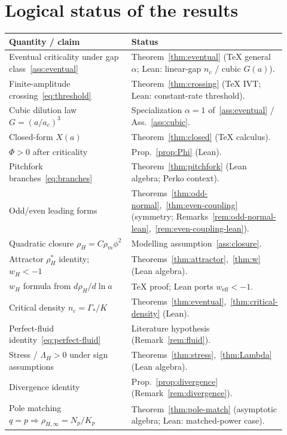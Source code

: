 \documentclass[11pt]{article}
\theoremstyle{definition}
\theoremstyle{remark}
\begin{document}
\section{Logical status of the results}
\label{sec:status}
\begin{center}
\small
\begin{tabular}{@{}p{0.46\linewidth}p{0.46\linewidth}@{}}
\toprule
\textbf{Quantity / claim} & \textbf{Status}\\
\midrule
Eventual criticality under gap class~\ref{ass:eventual} & Theorem~\ref{thm:eventual} (TeX general~$\alpha$; Lean: linear-gap $n_c$ / cubic $G(a)$).\\
Finite-amplitude crossing~\eqref{eq:threshold} & Theorem~\ref{thm:crossing} (TeX IVT; Lean: constant-rate threshold).\\
Cubic dilution law $G=(a/a_c)^3$ & Specialization $\alpha=1$ of~\ref{ass:eventual} / Ass.~\ref{ass:cubic}.\\
Closed-form $X(a)$ & Theorem~\ref{thm:closed} (TeX calculus).\\
$\Phi>0$ after criticality & Prop.~\ref{prop:Phi} (Lean).\\
Pitchfork branches~\eqref{eq:branches} & Theorem~\ref{thm:pitchfork} (Lean algebra; Perko context).\\
Odd/even leading forms & Theorems~\ref{thm:odd-normal},~\ref{thm:even-coupling} (symmetry; Remarks~\ref{rem:odd-normal-lean},~\ref{rem:even-coupling-lean}).\\
Quadratic closure $\rho_H=C\rho_m\phi^2$ & Modelling assumption~\ref{ass:closure}.\\
Attractor $\rho_H^*$ identity; $w_H<-1$ & Theorems~\ref{thm:attractor},~\ref{thm:w} (Lean algebra).\\
$w_H$ formula from $d\rho_H/d\ln a$ & TeX proof; Lean ports $w_{\mathrm{eff}}<-1$.\\
Critical density $n_c=\Gamma_*/K$ & Theorems~\ref{thm:eventual},~\ref{thm:critical-density} (Lean).\\
Perfect-fluid identity~\eqref{eq:perfect-fluid} & Literature hypothesis (Remark~\ref{rem:fluid}).\\
Stress / $\Lambda_H>0$ under sign assumptions & Theorems~\ref{thm:stress},~\ref{thm:Lambda} (Lean algebra).\\
Divergence identity & Prop.~\ref{prop:divergence} (Remark~\ref{rem:divergence}).\\
Pole matching $q=p\Rightarrow\rho_{H,\infty}=N_p/K_p$ & Theorem~\ref{thm:pole-match} (asymptotic algebra; Lean: matched-power case).\\

\end{tabular}
\end{center}
\end{document}
